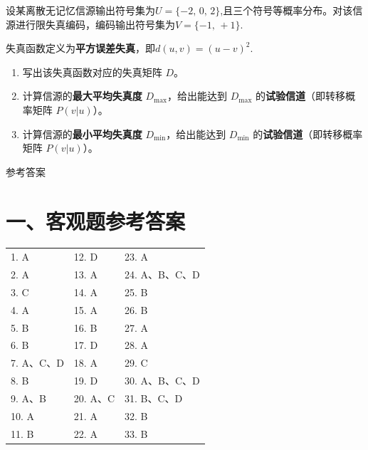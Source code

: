 \documentclass[UTF8,a4paper,12pt]{ctexart}
\begin{document}
\vspace{1.2em}

\noindent
设某离散无记忆信源输出符号集为$U=\{-2,\,0,\,2\}$,且三个符号等概率分布。对该信源进行限失真编码，编码输出符号集为$V=\{-1,\,+1\}$.

失真函数定义为\textbf{平方误差失真}，即$d(u,v)=(u-v)^2$.


\begin{enumerate}[label=\arabic*., leftmargin=2.2em]

\item 写出该失真函数对应的失真矩阵 $D$。

\item 计算信源的\textbf{最大平均失真度} $D_{\max}$，给出能达到 $D_{\max}$ 的\textbf{试验信道}（即转移概率矩阵 $P(v|u)$）。

\item 计算信源的\textbf{最小平均失真度} $D_{\min}$，给出能达到 $D_{\min}$ 的\textbf{试验信道}（即转移概率矩阵 $P(v|u)$）。

\end{enumerate}

\newpage

\newpage

\begin{center}
{\heiti{} 参考答案}
\end{center}

\vspace{1.5em}

\section*{一、客观题参考答案}

\begin{center}
\renewcommand{\arraystretch}{1.5}
\begin{tabularx}{\textwidth}{XXX}
1. A & 12. D & 23. A \\
2. A & 13. A & 24. A、B、C、D \\
3. C & 14. A & 25. B \\
4. A & 15. A & 26. B \\
5. B & 16. B & 27. A \\
6. B & 17. D & 28. A \\
7. A、C、D & 18. A & 29. C \\
8. B & 19. D & 30. A、B、C、D \\
9. A、B & 20. A、C & 31. B、C、D \\
10. A & 21. A & 32. B \\
11. B & 22. A & 33. B
\end{tabularx}
\end{center}
\end{document}
